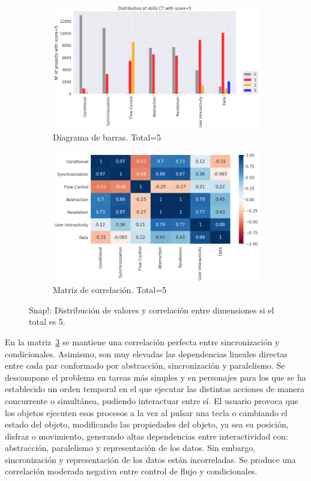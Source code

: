 \documentclass[a4paper, 12pt]{book}
\begin{document}
\begin{figure}[H]
    \centering
    \begin{subfigure}[h]{.49\textwidth} 
        \includegraphics[width=\textwidth]{img/distribucion_5_Snap}
        \caption{Diagrama de barras. Total=5}
        \label{fig:total5_Snap}
    \end{subfigure}       
    \begin{subfigure}[h]{.49\textwidth} 
        \includegraphics[width=\textwidth]{img/corr_5_Snap}
        \caption{Matriz de correlación. Total=5}
        \label{fig:corr5_Snap}
    \end{subfigure}
    \caption{Snap!: Distribución de valores y correlación entre dimensiones si el total es 5.}
\end{figure}

En la matriz~\ref{fig:corr5_Snap} se mantiene una correlación perfecta entre sincronización y condicionales. Asimismo, son muy elevadas las dependencias lineales directas entre cada par conformado por abstracción, sincronización y paralelismo. Se descompone el problema en tareas más simples y en personajes para los que se ha establecido un orden temporal en el que ejecutar las distintas acciones de manera concurrente o simultánea, pudiendo interactuar entre sí. El usuario provoca que los objetos ejecuten esos procesos a la vez al pulsar una tecla o cambiando el estado del objeto, modificando las propiedades del objeto, ya sea su posición, disfraz o movimiento, generando altas dependencias entre interactividad con: abstracción, paralelismo y representación de los datos. Sin embargo, sincronización y representación de los datos están incorreladas. Se produce una correlación moderada negativa entre control de flujo y condicionales. 
\end{document}

